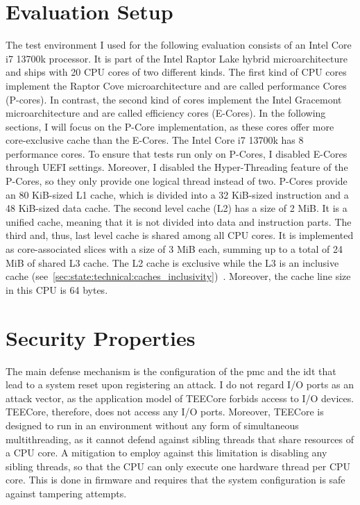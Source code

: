 \section{Evaluation Setup}
\label{sec:evaluation:setup}
The test environment I used for the following evaluation consists of an Intel
Core i7 13700k processor. It is part of the Intel Raptor Lake hybrid
microarchitecture and ships with 20 CPU cores of two different kinds. The first
kind of CPU cores implement the Raptor Cove microarchitecture and are called
performance Cores (P-cores). In contrast, the second kind of cores implement the
Intel Gracemont microarchitecture and are called efficiency cores (E-Cores). In
the following sections, I will focus on the P-Core implementation, as these
cores offer more core-exclusive cache than the E-Cores. The Intel Core i7 13700k
has 8 performance cores. To ensure that tests run only on P-Cores, I disabled
E-Cores through UEFI settings. Moreover, I disabled the Hyper-Threading feature
of the P-Cores, so they only provide one logical thread instead of two. P-Cores
provide an 80 KiB-sized L1 cache, which is divided into a 32 KiB-sized
instruction and a 48 KiB-sized data cache. The second level cache (L2) has a
size of 2 MiB. It is a unified cache, meaning that it is not divided into data
and instruction parts. The third and, thus, last level cache is shared among all
CPU cores. It is implemented as core-associated slices with a size of 3 MiB
each, summing up to a total of 24 MiB of shared L3 cache. The L2 cache is
exclusive while the L3 is an inclusive cache
(see~\ref{sec:state:technical:caches_inclusivity})~\cite{raptorlake_spec_sheet}.
Moreover, the cache line size in this CPU is 64 bytes.

\section{Security Properties}
\label{eval:sec}
The main defense mechanism is the configuration of the \gls{pmc} and the
\gls{idt} that lead to a system reset upon registering an attack. I do not
regard I/O ports as an attack vector, as the application model of TEECore
forbids access to I/O devices. TEECore, therefore, does not access any I/O
ports. Moreover, TEECore is designed to run in an environment without any form
of simultaneous multithreading, as it cannot defend against sibling threads that
share resources of a CPU core. A mitigation to employ against this limitation is
disabling any sibling threads, so that the CPU can only execute one hardware
thread per CPU core. This is done in firmware and requires that the system
configuration is safe against tampering attempts.\\

